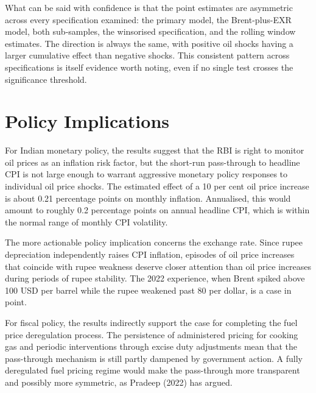What can be said with confidence is that the point estimates are asymmetric across every specification examined: the primary model, the Brent-plus-EXR model, both sub-samples, the winsorised specification, and the rolling window estimates. The direction is always the same, with positive oil shocks having a larger cumulative effect than negative shocks. This consistent pattern across specifications is itself evidence worth noting, even if no single test crosses the significance threshold.

\section{Policy Implications}

For Indian monetary policy, the results suggest that the RBI is right to monitor oil prices as an inflation risk factor, but the short-run pass-through to headline CPI is not large enough to warrant aggressive monetary policy responses to individual oil price shocks. The estimated effect of a 10 per cent oil price increase is about 0.21 percentage points on monthly inflation. Annualised, this would amount to roughly 0.2 percentage points on annual headline CPI, which is within the normal range of monthly CPI volatility.

The more actionable policy implication concerns the exchange rate. Since rupee depreciation independently raises CPI inflation, episodes of oil price increases that coincide with rupee weakness deserve closer attention than oil price increases during periods of rupee stability. The 2022 experience, when Brent spiked above 100 USD per barrel while the rupee weakened past 80 per dollar, is a case in point.

For fiscal policy, the results indirectly support the case for completing the fuel price deregulation process. The persistence of administered pricing for cooking gas and periodic interventions through excise duty adjustments mean that the pass-through mechanism is still partly dampened by government action. A fully deregulated fuel pricing regime would make the pass-through more transparent and possibly more symmetric, as Pradeep (2022) has argued.
